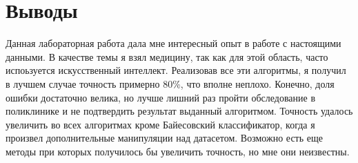 \section{Выводы}


Данная лабораторная работа дала мне интересный опыт в работе с настоящими данными. В качестве темы я взял медицину, так как для этой область, часто испоьзуется искусственный интеллект. Реализовав все эти
алгоритмы, я получил в лучшем случае точность примерно 80\%, что вполне неплохо. Конечно, доля ошибки
достаточно велика, но лучше лишний раз пройти обследование в поликлинике и не подтвердить результат выданный алгоритмом. Точность удалось увеличить во всех алгоритмах кроме Байесовский классификатор, когда я произвел дополнительные манипуляции над датасетом. Возможно есть еще методы при которых получилось бы увеличить точность, но мне они неизвестны. 

\pagebreak